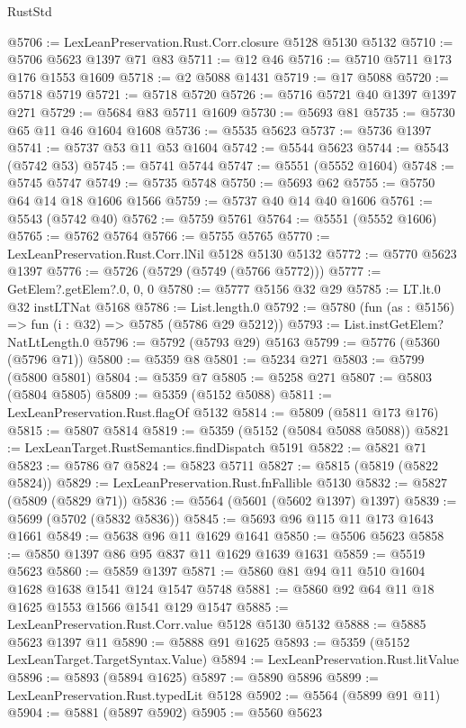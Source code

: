\begin{lexlean}{RustStd}
\begin{coremodule}
{\begin{coremodule}
{{{{{{{{{{{{{{{{{{{{{{{{{{{{{{{{@5706 := LexLeanPreservation.Rust.Corr.closure @5128 @5130 @5132
@5710 := @5706 @5623 @1397 @71 @83
@5711 := @12 @46
@5716 := @5710 @5711 @173 @176 @1553 @1609
@5718 := @2 @5088 @1431
@5719 := @17 @5088
@5720 := @5718 @5719
@5721 := @5718 @5720
@5726 := @5716 @5721 @40 @1397 @1397 @271
@5729 := @5684 @83 @5711 @1609
@5730 := @5693 @81
@5735 := @5730 @65 @11 @46 @1604 @1608
@5736 := @5535 @5623
@5737 := @5736 @1397
@5741 := @5737 @53 @11 @53 @1604
@5742 := @5544 @5623
@5744 := @5543 (@5742 @53)
@5745 := @5741 @5744
@5747 := @5551 (@5552 @1604)
@5748 := @5745 @5747
@5749 := @5735 @5748
@5750 := @5693 @62
@5755 := @5750 @64 @14 @18 @1606 @1566
@5759 := @5737 @40 @14 @40 @1606
@5761 := @5543 (@5742 @40)
@5762 := @5759 @5761
@5764 := @5551 (@5552 @1606)
@5765 := @5762 @5764
@5766 := @5755 @5765
@5770 := LexLeanPreservation.Rust.Corr.lNil @5128 @5130 @5132
@5772 := @5770 @5623 @1397
@5776 := @5726 (@5729 (@5749 (@5766 @5772)))
@5777 := GetElem?.getElem?.{0, 0, 0}
@5780 := @5777 @5156 @32 @29
@5785 := LT.lt.{0} @32 instLTNat @5168
@5786 := List.length.{0}
@5792 := @5780 (fun (as : @5156) => fun (i : @32) => @5785 (@5786 @29 @5212))
@5793 := List.instGetElem?NatLtLength.{0}
@5796 := @5792 (@5793 @29) @5163
@5799 := @5776 (@5360 (@5796 @71))
@5800 := @5359 @8
@5801 := @5234 @271
@5803 := @5799 (@5800 @5801)
@5804 := @5359 @7
@5805 := @5258 @271
@5807 := @5803 (@5804 @5805)
@5809 := @5359 (@5152 @5088)
@5811 := LexLeanPreservation.Rust.flagOf @5132
@5814 := @5809 (@5811 @173 @176)
@5815 := @5807 @5814
@5819 := @5359 (@5152 (@5084 @5088 @5088))
@5821 := LexLeanTarget.RustSemantics.findDispatch @5191
@5822 := @5821 @71
@5823 := @5786 @7
@5824 := @5823 @5711
@5827 := @5815 (@5819 (@5822 @5824))
@5829 := LexLeanPreservation.Rust.fnFallible @5130
@5832 := @5827 (@5809 (@5829 @71))
@5836 := @5564 (@5601 (@5602 @1397) @1397)
@5839 := @5699 (@5702 (@5832 @5836))
@5845 := @5693 @96 @115 @11 @173 @1643 @1661
@5849 := @5638 @96 @11 @1629 @1641
@5850 := @5506 @5623
@5858 := @5850 @1397 @86 @95 @837 @11 @1629 @1639 @1631
@5859 := @5519 @5623
@5860 := @5859 @1397
@5871 := @5860 @81 @94 @11 @510 @1604 @1628 @1638 @1541 @124 @1547 @5748
@5881 := @5860 @92 @64 @11 @18 @1625 @1553 @1566 @1541 @129 @1547
@5885 := LexLeanPreservation.Rust.Corr.value @5128 @5130 @5132
@5888 := @5885 @5623 @1397 @11
@5890 := @5888 @91 @1625
@5893 := @5359 (@5152 LexLeanTarget.TargetSyntax.Value)
@5894 := LexLeanPreservation.Rust.litValue
@5896 := @5893 (@5894 @1625)
@5897 := @5890 @5896
@5899 := LexLeanPreservation.Rust.typedLit @5128
@5902 := @5564 (@5899 @91 @11)
@5904 := @5881 (@5897 @5902)
@5905 := @5560 @5623
}}}}}}}}}}}}}}}}}}}}}}}}}}}}}}}}
\end{coremodule}}
\end{coremodule}
\end{lexlean}
